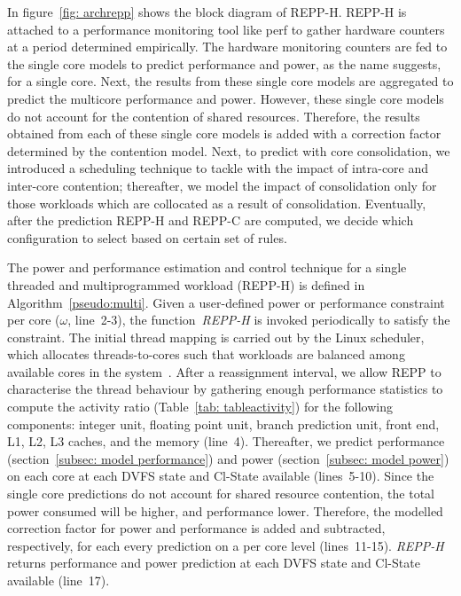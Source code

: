 In figure~\ref{fig: archrepp} shows the block diagram of REPP-H. REPP-H is attached to a
performance monitoring tool like \textsf{perf} to gather hardware counters at a period
determined empirically. The hardware monitoring counters are fed to the single core models
to predict performance and power, as the name suggests, for a single core. Next, the
results from these single core models are aggregated to predict the multicore performance
and power.  However, these single core models do not account for the contention of shared
resources.  Therefore, the results obtained from each of these single core models is added
with a correction factor determined by the contention model.  Next, to predict with core
consolidation, we introduced a scheduling technique to tackle with the impact of
intra-core and inter-core contention; thereafter, we model the impact of consolidation
only for those workloads which are collocated as a result of consolidation. Eventually,
after the prediction REPP-H and REPP-C are computed, we decide which configuration to
select based on certain set of rules. 





The power and performance estimation and control technique for a single threaded and
multiprogrammed workload (REPP-H) is defined in Algorithm~\ref{pseudo:multi}.  Given a
user-defined power or performance constraint per core ($\omega$, line~2-3), the
function~\textsl{REPP-H} is invoked periodically to satisfy the constraint. The initial
thread mapping is carried out by the Linux scheduler, which allocates threads-to-cores
such that workloads are balanced among available cores in the system~\citep{LinuxKernel}.
After a reassignment interval, we allow REPP to characterise the thread behaviour by
gathering enough performance statistics to compute the activity ratio (Table~\ref{tab:
tableactivity}) for the following components: integer unit, floating point unit, branch
prediction unit, front end, L1, L2, L3 caches, and the memory (line~4).  Thereafter, we
predict performance (section~\ref{subsec: model performance}) and power
(section~\ref{subsec: model power}) on each core at each DVFS state and Cl-State available
(lines~5-10). Since the single core predictions do not account for shared resource
contention, the total power consumed will be higher, and performance lower.  Therefore,
the modelled correction factor for power and performance is added and subtracted,
respectively, for each every prediction on a per core level (lines~11-15).
\textsl{REPP-H} returns performance and power prediction at each DVFS state and Cl-State
available (line~17).

